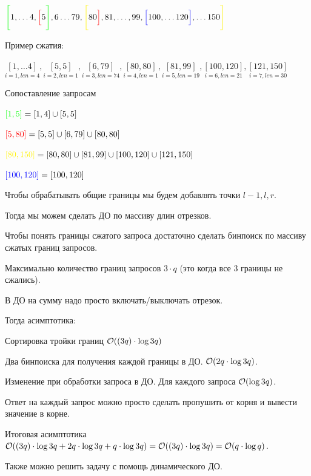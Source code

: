 $\green{\Bigg[} 1, \ldots 4, \red{\Big[} 5 \green{\Bigg]}, 6 \ldots 79, \yellow{\Bigg[}80 \red{\Big]}, 81, \ldots, 99, \blue{\Big[}100, \ldots 120 \blue{\Big]}, \ldots 150 \yellow{\Bigg]}$

Пример сжатия:

$\underset{i=1, len = 4}{[1, \ldots 4]}, \underset{i=2, len=1}{[5, 5]}, \underset{i=3, len=74}{[6, 79]}, \underset{i=4, len=1}{[80, 80]}, \underset{i=5, len=19}{[81, 99]}, \underset{i=6, len=21}{[100, 120]}, \underset{i=7, len=30}{[121, 150]}$

Сопоставление запросам 

${\color{green}{[1, 5]}} = [1, 4] \cup [5, 5]$

${\color{red}{[5, 80]}} = [5, 5] \cup [6, 79] \cup [80, 80]$

$\yellow{[80, 150]} = [80, 80] \cup [81, 99] \cup [100, 120] \cup [121, 150]$

${\color{blue}{[100, 120]}} = [100, 120]$

Чтобы обрабатывать общие границы мы будем добавлять точки $l-1,l,r$.

Тогда мы можем сделать ДО по массиву длин отрезков.

Чтобы понять границы сжатого запроса достаточно сделать бинпоиск по массиву сжатых границ запросов.

Максимально количество границ запросов $3 \cdot q$ (это когда все 3 границы не сжались).

В ДО на сумму надо просто включать/выключать отрезок.

Тогда асимптотика:

\up \up
\begin{MyList}[0pt]
	\item Сортировка тройки границ $\mathcal{O}((3q) \cdot \log 3q)$
	
	\item Два бинпоиска для получения каждой границы в ДО. $\mathcal{O}(2q \cdot \log 3q)$.
	
	\item Изменение при обработки запроса в ДО. Для каждого запроса $\mathcal{O}(\log 3q)$.
	
	\item Ответ на каждый запрос можно просто сделать пропушить от корня и вывести значение в корне.
\end{MyList}

Итоговая асимптотика $\mathcal{O}((3q) \cdot \log 3q + 2q \cdot \log 3q + q \cdot \log 3q) = \mathcal{O}((3q) \cdot \log 3q) = \mathcal{O}(q \cdot \log q)$.

Также можно решить задачу с помощь динамического ДО.

